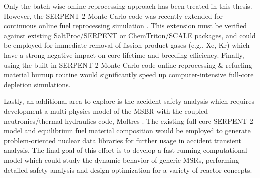 Only the batch-wise online reprocessing approach has been treated in this 
thesis. However, the SERPENT 2 Monte Carlo code was recently extended for 
continuous online fuel reprocessing simulation \cite{aufiero_extended_2013}. 
This extension must be verified against existing SaltProc/SERPENT or 
ChemTriton/SCALE packages, and could be employed for immediate removal of 
fission product gases (e.g., Xe, Kr) which have a strong negative impact on 
core lifetime and breeding efficiency. Finally, using the built-in SERPENT 2 
Monte Carlo code online reprocessing \& refueling material burnup routine would 
significantly speed up computer-intensive full-core depletion simulations.

Lastly, an additional area to explore is the accident safety analysis which 
requires development a multi-physics model of the \gls{MSBR} with the coupled 
neutronics/thermal-hydraulics code, Moltres \cite{lindsay_introduction_2018}. 
The existing full-core SERPENT 2 model and equilibrium fuel material 
composition would be employed to generate problem-oriented nuclear data 
libraries for further usage in accident transient analysis. The final goal of 
this effort is to develop a fast-running computational model which could study 
the dynamic behavior of generic \glspl{MSR}, performing detailed safety 
analysis and design optimization for a variety of reactor concepts.
